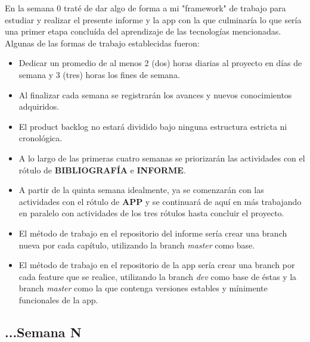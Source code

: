 En la semana 0 traté de dar algo de forma a mi "framework" de trabajo para estudiar
y realizar el presente informe y la app con la que culminaría lo que sería una primer etapa
concluída del aprendizaje de las tecnologías mencionadas. Algunas de las formas de trabajo 
establecidas fueron:

\begin{itemize}
\item Dedicar un promedio de al menos 2 (dos) horas diarias al proyecto en días de semana y 3
(tres) horas los fines de semana.
\item Al finalizar cada semana se registrarán los avances y nuevos conocimientos adquiridos.
\item El product backlog no estará dividido bajo ninguna estructura estricta ni cronológica.
\item A lo largo de las primeras cuatro semanas se priorizarán las actividades con el rótulo de 
\textbf{BIBLIOGRAFÍA} e \textbf{INFORME}.
\item A partir de la quinta semana idealmente, ya se comenzarán con las actividades con el rótulo
de \textbf{APP} y se continuará de aquí en más trabajando en paralelo con actividades de los tres
rótulos hasta concluir el proyecto.
\item El método de trabajo en el repositorio del informe sería crear una branch nueva por cada
capítulo, utilizando la branch \textit{master} como base.
\item El método de trabajo en el repositorio de la app sería crear una branch por cada feature
que se realice, utilizando la branch \textit{dev} como base de éstas y la branch \textit{master}
como la que contenga versiones estables y mínimente funcionales de la app.
\end{itemize}


\subsection{...Semana N}